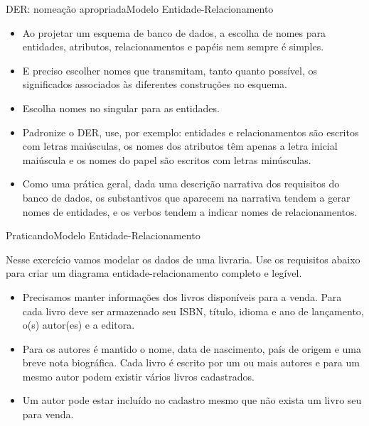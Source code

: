 \documentclass[t]{beamer}
\begin{document}

\begin{ftst}{DER: nomeação apropriada}{Modelo Entidade-Relacionamento}
\small
\begin{itemize}
    \item Ao projetar um esquema de banco de dados, a escolha de nomes para entidades, atributos, relacionamentos e papéis nem sempre é simples.
    \item E preciso escolher nomes que transmitam, tanto quanto possível, os significados associados às diferentes construções no esquema. 
    \item Escolha nomes no singular para as entidades.
    \item Padronize o DER, use, por exemplo: entidades e relacionamentos são escritos com letras maiúsculas, os nomes dos atributos têm apenas a letra inicial maiúscula e os nomes do papel são escritos com letras minúsculas.
    \item Como uma prática geral, dada uma descrição narrativa dos requisitos do banco de dados, os substantivos que aparecem na narrativa tendem a gerar nomes de entidades, e os verbos tendem a indicar nomes de relacionamentos. 
\end{itemize}
\end{ftst}


\begin{ftst}{Praticando}{Modelo Entidade-Relacionamento}

Nesse exercício vamos modelar os dados de uma livraria. Use os requisitos abaixo para criar um diagrama entidade-relacionamento completo e legível.
\vone
\begin{itemize}
    \item Precisamos manter informações dos livros disponíveis para a venda. Para cada livro deve ser armazenado seu ISBN, título, idioma e ano de lançamento, o(s) autor(es) e a editora.
    \item Para os autores é mantido o nome, data de nascimento, país de origem e uma breve nota biográfica.
    \ite Cada livro é escrito por um ou mais autores e para um mesmo autor podem existir vários livros cadastrados.
    \item Um autor pode estar incluído no cadastro mesmo que não exista um livro seu para venda.
    
\end{itemize}

\end{ftst}
\end{document}
